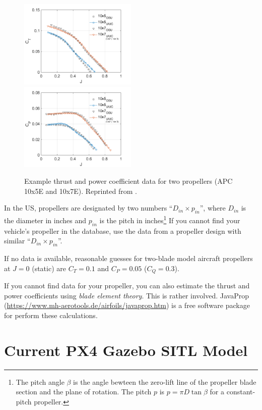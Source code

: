 \documentclass[12pt]{article}
\begin{document}
\begin{figure}
    \includegraphics[width=0.5\textwidth]{UIUC-OSU-APC-E-comparison-June-2015-CT.png}
    \includegraphics[width=0.5\textwidth]{UIUC-OSU-APC-E-comparison-June-2015-CP.png}
    \caption{\label{fig:prop_data_example} Example thrust and power coefficient data for two propellers (APC 10x5E and 10x7E). Reprinted from \cite{UIUCdatabase}.}
\end{figure}

In the US, propellers are designated by two numbers ``$D_{in} \times p_{in}$'', where $D_{in}$ is the diameter in inches and $p_{in}$ is the pitch in inches\footnote{The pitch angle $\beta$ is the angle bewteen the zero-lift line of the propeller blade section and the plane of rotation. The pitch $p$ is $p = \pi D \tan \beta$ for a constant-pitch propeller.} If you cannot find your vehicle's propeller in the database, use the data from a propeller design with similar ``$D_{in} \times p_{in}$''.

If no data is available, reasonable guesses for two-blade model aircraft propellers at $J=0$ (static) are $C_T = 0.1$ and $C_P = 0.05$ ($C_Q = 0.3$).

If you cannot find data for your propeller, you can also estimate the thrust and power coefficients using \emph{blade element theory}. This is rather involved. JavaProp (\url{https://www.mh-aerotools.de/airfoils/javaprop.htm}) is a free software package for perform these calculations.


\section{Current PX4 Gazebo SITL Model}
\end{document}
